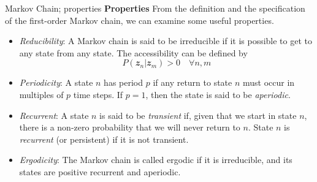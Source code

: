 \documentclass{bredelebeamer}
\begin{document}
\begin{frame}{Markov Chain; properties}
  \textbf{Properties}
  From the definition and the specification of the first-order Markov chain,
  we can examine some useful properties.
  \begin{itemize}
    \item \textit{Reducibility}:
    A Markov chain is said to be irreducible if it is possible to get
    to any state from any state. The accessibility can be defined by
    \begin{equation}
      P(\mathbfit{z}_{n} | \mathbfit{z}_{m}) > 0 \quad \forall n, m
    \end{equation}
    \item \textit{Periodicity}:
    A state $n$ has period $p$ if any return to state $n$ must occur in
    multiples of $p$ time steps. If $p = 1$, then the state is said to
    be \textit{aperiodic}.
    \item \textit{Recurrent}:
    A state $n$ is said to be \textit{transient} if, given that we start
    in state $n$, there is a non-zero probability that we will never
    return to $n$. State $n$ is \textit{recurrent} (or persistent) if
    it is not transient.
    \item \textit{Ergodicity}:
    The Markov chain is called ergodic if it is irreducible, and its
    states are positive recurrent and aperiodic.
  \end{itemize}
\end{frame}
\end{document}
